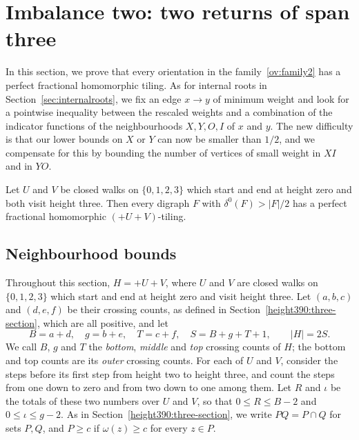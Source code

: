 \section{Imbalance two: two returns of span three}\label{sec:tworeturns}
In this section, we prove that every orientation in the family~\ref{ov:family2} has a perfect fractional homomorphic tiling. As for internal roots in Section~\ref{sec:internalroots}, we fix an edge $x\to y$ of minimum weight and look for a pointwise inequality between the rescaled weights and a combination of the indicator functions of the neighbourhoods $X,Y,O,I$ of $x$ and $y$. The new difficulty is that our lower bounds on $X$ or $Y$ can now be smaller than $1/2$, and we compensate for this by bounding the number of vertices of small weight in $XI$ and in $YO$.

\begin{theorem}
\label{compact390:two-block}
Let $U$ and $V$ be closed
walks on $\{0,1,2,3\}$ which start and end at height zero and both visit height three. Then every digraph $F$ with $\delta^0(F)>|F|/2$ has a perfect fractional homomorphic $(+U+V)$-tiling.
\end{theorem}

\subsection{Neighbourhood bounds}
\label{compact390:maps-section}
Throughout this section, $H=+U+V$, where $U$ and $V$ are closed
walks on $\{0,1,2,3\}$ which start and end at height zero and
visit height three. Let $(a,b,c)$ and
$(d,e,f)$ be their crossing counts, as defined in Section~\ref{height390:three-section}, which are all positive, and let
\[
 B=a+d,\quad g=b+e,\quad T=c+f,\quad S=B+g+T+1,
 \qquad |H|=2S.
\]
We call $B$, $g$ and $T$ the \emph{bottom}, \emph{middle} and \emph{top} crossing counts of $H$; the bottom and top counts are its \emph{outer} crossing counts.
For each of $U$ and $V$, consider the steps before its first step from height two to height three, and count the steps from one down to zero and from two down to one among them. Let $R$ and $\iota$ be the totals of these two numbers over $U$ and $V$, so that
$0\le R\le B-2$ and $0\le\iota\le g-2$. As in Section~\ref{height390:three-section}, we write $PQ=P\cap Q$
for sets $P,Q$, and $P\ge c$ if $\omega(z)\ge c$ for every $z\in P$.

